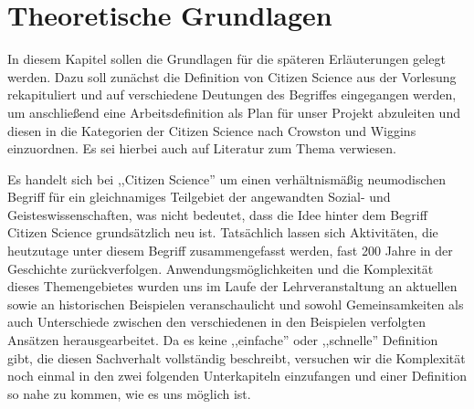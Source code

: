 \documentclass{article}
\begin{document}
\section{Theoretische Grundlagen}
In diesem Kapitel sollen die Grundlagen für die späteren Erläuterungen gelegt werden.
Dazu soll zunächst die Definition von Citizen Science aus der Vorlesung rekapituliert und auf verschiedene Deutungen des Begriffes eingegangen werden, um anschließend eine Arbeitsdefinition als Plan für unser Projekt abzuleiten und diesen in die Kategorien der Citizen Science nach Crowston und Wiggins einzuordnen.
Es sei hierbei auch auf Literatur zum Thema verwiesen.

Es handelt sich bei ,,Citizen Science'' um einen verhältnismäßig neumodischen Begriff
für ein gleichnamiges Teilgebiet der angewandten Sozial- und Geisteswissenschaften,
was nicht bedeutet, dass die Idee hinter dem Begriff Citizen Science grundsätzlich neu ist.
Tatsächlich lassen sich Aktivitäten, die heutzutage unter diesem Begriff zusammengefasst werden,
fast 200 Jahre in der Geschichte zurückverfolgen.
Anwendungsmöglichkeiten und die Komplexität dieses Themengebietes
wurden uns im Laufe der Lehrveranstaltung an aktuellen sowie an historischen Beispielen veranschaulicht
und sowohl Gemeinsamkeiten als auch Unterschiede zwischen den verschiedenen in den Beispielen verfolgten Ansätzen herausgearbeitet.
Da es keine ,,einfache'' oder ,,schnelle'' Definition gibt, die diesen Sachverhalt vollständig beschreibt,
versuchen wir die Komplexität noch einmal in den zwei folgenden Unterkapiteln einzufangen
und einer Definition so nahe zu kommen, wie es uns möglich ist.
\end{document}
